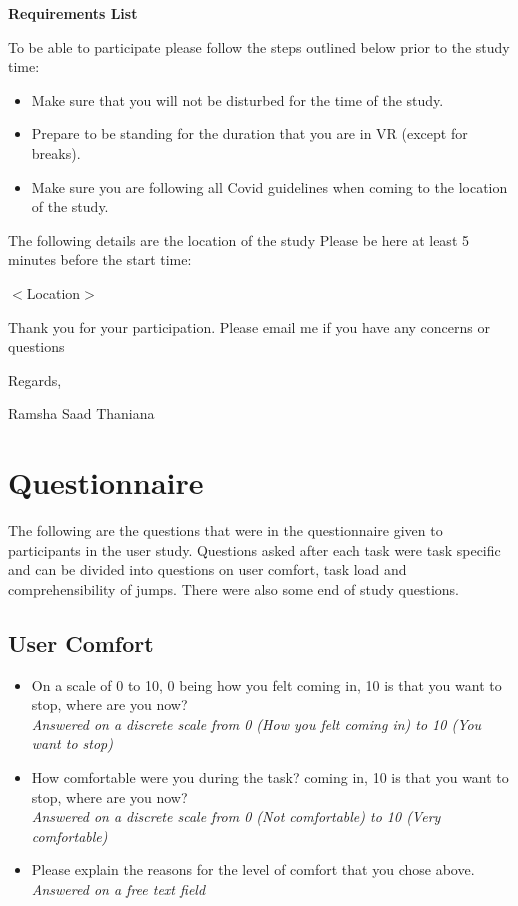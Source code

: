 \textbf{Requirements List}

To be able to participate please follow the steps outlined below prior to the study time:

\begin{itemize}
	\item Make sure that you will not be disturbed for the time of the study.
	\item Prepare to be standing for the duration that you are in VR (except for breaks).
	\item Make sure you are following all Covid guidelines when coming to the location of the study.
\end{itemize}

The following details are the location of the study Please be here at least 5 minutes before the start time:

$<$Location$>$

Thank you for your participation. Please email me if you have any concerns or questions

Regards,

Ramsha Saad Thaniana

\section{Questionnaire}
\label{Appendix:Questionnaire}
The following are the questions that were in the questionnaire given to participants in the user study. Questions asked after each task were task specific and can be divided into questions on user comfort, task load and comprehensibility of jumps. There were also some end of study questions.
\subsection{User Comfort}
\begin{itemize}
	\item On a scale of 0 to 10, 0 being how you felt coming in, 10 is that you want to stop, where are you now?\\
	\textit{Answered on a discrete scale from 0 (How you felt coming in) to 10 (You want to stop)}
	\item How comfortable were you during the task? coming in, 10 is that you want to stop, where are you now?\\ 
	\textit{Answered on a discrete scale from 0 (Not comfortable) to 10 (Very comfortable)}
	\item Please explain the reasons for the level of comfort that you chose above.\\
	\textit{Answered on a free text field}
\end{itemize}
